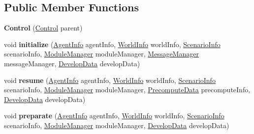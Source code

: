 \subsection*{Public Member Functions}
\begin{DoxyCompactItemize}
\item 
\hypertarget{classadf_1_1component_1_1control_1_1Control_aeaab5064a2bfb271229b3b62a91c471c}{}\label{classadf_1_1component_1_1control_1_1Control_aeaab5064a2bfb271229b3b62a91c471c} 
{\bfseries Control} (\hyperlink{classadf_1_1component_1_1control_1_1Control}{Control} parent)
\item 
\hypertarget{classadf_1_1component_1_1control_1_1Control_a9107790ea778ff584c60b3939088d512}{}\label{classadf_1_1component_1_1control_1_1Control_a9107790ea778ff584c60b3939088d512} 
void {\bfseries initialize} (\hyperlink{classadf_1_1agent_1_1info_1_1AgentInfo}{Agent\+Info} agent\+Info, \hyperlink{classadf_1_1agent_1_1info_1_1WorldInfo}{World\+Info} world\+Info, \hyperlink{classadf_1_1agent_1_1info_1_1ScenarioInfo}{Scenario\+Info} scenario\+Info, \hyperlink{classadf_1_1agent_1_1module_1_1ModuleManager}{Module\+Manager} module\+Manager, \hyperlink{classadf_1_1agent_1_1communication_1_1MessageManager}{Message\+Manager} message\+Manager, \hyperlink{classadf_1_1agent_1_1develop_1_1DevelopData}{Develop\+Data} develop\+Data)
\item 
\hypertarget{classadf_1_1component_1_1control_1_1Control_ad9dfcd335a556fb0a3e3be9879a9656e}{}\label{classadf_1_1component_1_1control_1_1Control_ad9dfcd335a556fb0a3e3be9879a9656e} 
void {\bfseries resume} (\hyperlink{classadf_1_1agent_1_1info_1_1AgentInfo}{Agent\+Info} agent\+Info, \hyperlink{classadf_1_1agent_1_1info_1_1WorldInfo}{World\+Info} world\+Info, \hyperlink{classadf_1_1agent_1_1info_1_1ScenarioInfo}{Scenario\+Info} scenario\+Info, \hyperlink{classadf_1_1agent_1_1module_1_1ModuleManager}{Module\+Manager} module\+Manager, \hyperlink{classadf_1_1agent_1_1precompute_1_1PrecomputeData}{Precompute\+Data} precompute\+Info, \hyperlink{classadf_1_1agent_1_1develop_1_1DevelopData}{Develop\+Data} develop\+Data)
\item 
\hypertarget{classadf_1_1component_1_1control_1_1Control_a5cb4d26b41cd93b2a0ea06963c71fee5}{}\label{classadf_1_1component_1_1control_1_1Control_a5cb4d26b41cd93b2a0ea06963c71fee5} 
void {\bfseries preparate} (\hyperlink{classadf_1_1agent_1_1info_1_1AgentInfo}{Agent\+Info} agent\+Info, \hyperlink{classadf_1_1agent_1_1info_1_1WorldInfo}{World\+Info} world\+Info, \hyperlink{classadf_1_1agent_1_1info_1_1ScenarioInfo}{Scenario\+Info} scenario\+Info, \hyperlink{classadf_1_1agent_1_1module_1_1ModuleManager}{Module\+Manager} module\+Manager, \hyperlink{classadf_1_1agent_1_1develop_1_1DevelopData}{Develop\+Data} develop\+Data)

\end{DoxyCompactItemize}
